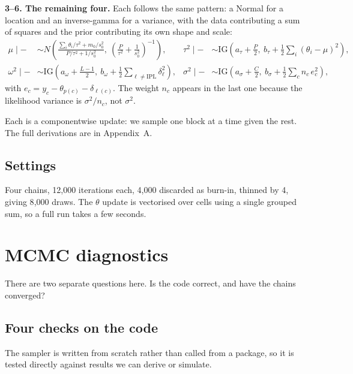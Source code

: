 \documentclass[11pt,a4paper]{article}
\begin{document}
\textbf{3--6. The remaining four.} Each follows the same pattern: a Normal for a location and
an inverse-gamma for a variance, with the data contributing a sum of squares and the prior
contributing its own shape and scale:
\begin{align*}
\mu \mid - &\sim N\!\left(\frac{\sum_i \theta_i/\tau^2 + m_0/s_0^2}{P/\tau^2 + 1/s_0^2},\
\left(\tfrac{P}{\tau^2}+\tfrac{1}{s_0^2}\right)^{-1}\right), &
\tau^2 \mid - &\sim \mathrm{IG}\!\left(a_\tau + \tfrac{P}{2},\ b_\tau + \tfrac{1}{2}\textstyle\sum_i (\theta_i-\mu)^2\right),\\
\omega^2 \mid - &\sim \mathrm{IG}\!\left(a_\omega + \tfrac{L-1}{2},\ b_\omega + \tfrac{1}{2}\textstyle\sum_{\ell \neq \text{IPL}} \delta_\ell^2\right), &
\sigma^2 \mid - &\sim \mathrm{IG}\!\left(a_\sigma + \tfrac{C}{2},\ b_\sigma + \tfrac{1}{2}\textstyle\sum_c n_c\, e_c^2\right),
\end{align*}
with $e_c = y_c - \theta_{p(c)} - \delta_{\ell(c)}$. The weight $n_c$ appears in the last one
because the likelihood variance is $\sigma^2/n_c$, not $\sigma^2$.

Each is a componentwise update: we sample one block at a time given the rest. The full
derivations are in Appendix~A.

\subsection{Settings}

Four chains, 12{,}000 iterations each, 4{,}000 discarded as burn-in, thinned by 4, giving
8{,}000 draws. The $\theta$ update is vectorised over cells using a single grouped sum, so a
full run takes a few seconds.

\section{MCMC diagnostics}

There are two separate questions here. Is the code correct, and have the chains converged?

\subsection{Four checks on the code}

The sampler is written from scratch rather than called from a package, so it is tested
directly against results we can derive or simulate.
\end{document}
